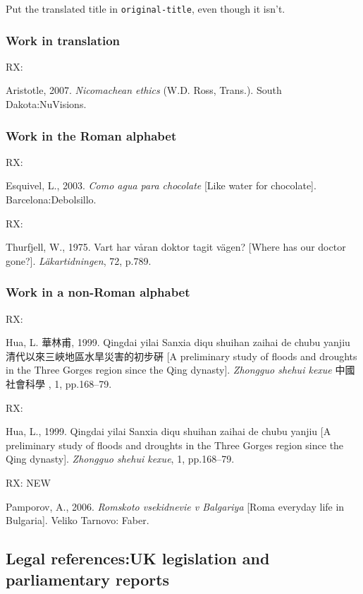 Put the translated title in \texttt{original-title}, even though it isn't.

\subsubsection*{Work in translation}

RX: \cite{aristotle2007ne}

Aristotle, 2007. \emph{Nicomachean ethics} (W.D. Ross, Trans.). South Dakota:\@ NuVisions.



\subsubsection*{Work in the Roman alphabet}

RX: \cite{esquivel2003cap}

Esquivel, L., 2003. \emph{Como agua para chocolate} [Like water for chocolate]. Barcelona:\@ Debolsillo.



RX: \cite{thurfjell1975vhv}

Thurfjell, W., 1975. Vart har våran doktor tagit vägen? [Where has our doctor gone?]. \emph{Läkartidningen}, 72, p.789.



\subsubsection*{Work in a non-Roman alphabet}

RX: \cite{hua1999qys1}

Hua, L. 華林甫, 1999.  Qingdai yilai Sanxia diqu shuihan zaihai de chubu yanjiu 清代以來三峽地區水旱災害的初步硏 [A preliminary study of floods and droughts in the Three Gorges region since the Qing dynasty]. \emph{Zhongguo shehui kexue} 中國社會科學 , 1, pp.168--79.


RX: \cite{hua1999qys2}

Hua, L., 1999. Qingdai yilai Sanxia diqu shuihan zaihai de chubu yanjiu [A preliminary study of floods and droughts in the Three Gorges region since the Qing dynasty]. \emph{Zhongguo shehui kexue}, 1, pp.168--79.


RX: \cite{pamporov2006rvb} NEW

Pamporov, A., 2006. \emph{Romskoto vsekidnevie v Balgariya} [Roma everyday life in Bulgaria]. Veliko Tarnovo: Faber.



\subsection{Legal references:\@ UK legislation and parliamentary reports}

